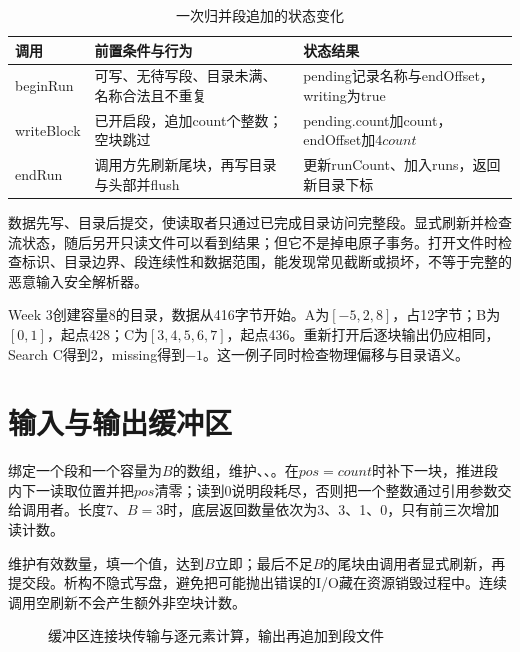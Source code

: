 \begin{table}[htbp]\centering\caption{一次归并段追加的状态变化}\label{tab:append}
\begin{tabularx}{\linewidth}{lYY}\toprule
调用 & 前置条件与行为 & 状态结果\\\midrule
beginRun & 可写、无待写段、目录未满、名称合法且不重复 & pending记录名称与endOffset，writing为true\\
writeBlock & 已开启段，追加count个整数；空块跳过 & pending.count加count，endOffset加$4count$\\
endRun & 调用方先刷新尾块，再写目录与头部并flush & 更新runCount、加入runs，返回新目录下标\\\bottomrule
\end{tabularx}\end{table}

数据先写、目录后提交，使读取者只通过已完成目录访问完整段。显式刷新并检查流状态，随后另开只读文件可以看到结果；但它不是掉电原子事务。打开文件时检查标识、目录边界、段连续性和数据范围，能发现常见截断或损坏，不等于完整的恶意输入安全解析器。

Week 3创建容量8的目录，数据从416字节开始。A为$[-5,2,8]$，占12字节；B为$[0,1]$，起点428；C为$[3,4,5,6,7]$，起点436。重新打开后逐块输出仍应相同，Search C得到2，missing得到$-1$。这一例子同时检查物理偏移与目录语义。

\section{输入与输出缓冲区}
绑定一个段和一个容量为$B$的数组，维护、、。在$pos=count$时补下一块，推进段内下一读取位置并把$pos$清零；读到0说明段耗尽，否则把一个整数通过引用参数交给调用者。长度7、$B=3$时，底层返回数量依次为3、3、1、0，只有前三次增加读计数。

维护有效数量，填一个值，达到$B$立即；最后不足$B$的尾块由调用者显式刷新，再提交段。析构不隐式写盘，避免把可能抛出错误的I/O藏在资源销毁过程中。连续调用空刷新不会产生额外非空块计数。

\begin{figure}[htbp]\centering
{}\caption{缓冲区连接块传输与逐元素计算，输出再追加到段文件}\label{fig:buffer-flow}\end{figure}

